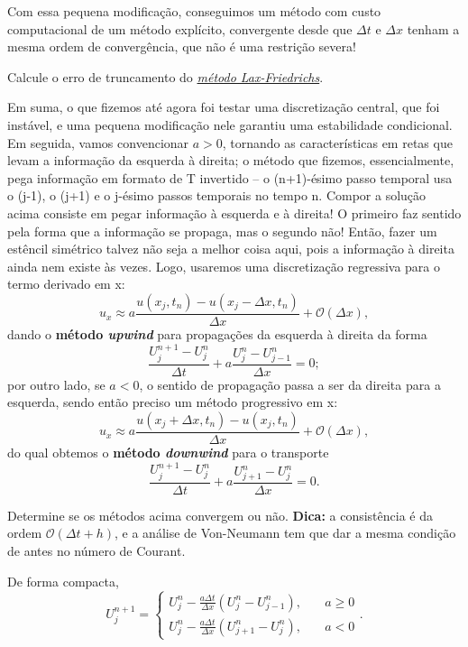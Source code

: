 \documentclass[../differential_methods.tex]{subfiles}
\begin{document}
Com essa pequena modificação, conseguimos um método com custo computacional de um método explícito, convergente desde que \(\Delta t\) e \(\Delta x\) tenham a mesma ordem de convergência, que não é uma restrição severa!
\begin{exr}
	Calcule o erro de truncamento do \hyperlink{lax_friedrichs}{\textit{método Lax-Friedrichs}}.
\end{exr}

Em suma, o que fizemos até agora foi testar uma discretização central, que foi instável, e uma pequena modificação nele garantiu uma estabilidade condicional. Em seguida, vamos convencionar \(a > 0\), tornando as características em retas que levam a informação da esquerda à direita; o método que fizemos, essencialmente, pega informação em formato de T invertido -- o (n+1)-ésimo passo temporal usa o (j-1), o (j+1) e o j-ésimo passos temporais no tempo n. Compor a solução acima consiste em pegar informação à esquerda e à direita! O primeiro faz sentido pela forma que a informação se propaga, mas o segundo não! Então, fazer um estêncil simétrico talvez não seja a melhor coisa aqui, pois a informação à direita ainda nem existe às vezes.
Logo, usaremos uma discretização regressiva para o termo derivado em x:
\[
	u_x \approx a \frac{u(x_{j}, t_{n}) - u(x_{j}-\Delta x, t_{n})}{\Delta x} + \mathcal{O}(\Delta x),
\]
dando o \hypertarget{up_wind}{\textbf{método \textit{upwind}}} para propagações da esquerda à direita da forma
\[
	\frac{U_{j}^{n+1}-U_{j}^{n}}{\Delta t} + a \frac{U_{j}^{n} - U_{j-1}^{n}}{\Delta x} = 0;
\]
por outro lado, se \(a < 0\), o sentido de propagação passa a ser da direita para a esquerda, sendo então preciso um método progressivo em x:
\[
	u_{x} \approx a \frac{u(x_{j}+\Delta x, t_{n}) - u(x_{j}, t_{n})}{\Delta x}+\mathcal{O}(\Delta x),
\]
do qual obtemos o \textbf{método \textit{downwind}} para o transporte
\[
	\frac{U_{j}^{n+1} - U_{j}^{n}}{\Delta t} + a \frac{U_{j+1}^{n} - U_{j}^{n}}{\Delta x} = 0.
\]
\begin{exr}
	Determine se os métodos acima convergem ou não. \textbf{Dica:} a consistência é da ordem \(\mathcal{O}(\Delta t+ h)\), e a análise de Von-Neumann tem que dar a mesma condição de antes no número de Courant.
\end{exr}
De forma compacta,
\[
	U_{j}^{n+1} = \left\{\begin{array}{ll}
		U_{j}^{n} - \frac{a \Delta t}{\Delta x}(U_{j}^{n} - U_{j-1}^{n}), & \quad a \geq 0 \\
		U_{j}^{n} - \frac{a\Delta t}{\Delta x}(U_{j+1}^{n} - U_{j}^{n}),  & \quad a < 0
	\end{array}\right..
\]
\end{document}
